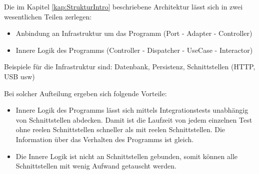 
    Die im Kapitel \ref{kap:StrukturIntro} beschriebene Architektur lässt sich in zwei wesentlichen Teilen zerlegen:
    \begin{itemize}
        \item Anbindung an Infrastruktur um das Programm (Port - Adapter - Controller)
        \item Innere Logik des Programms (Controller - Dispatcher - UseCase - Interactor)
    \end{itemize}

    Beispiele für die Infrastruktur sind: Datenbank, Persistenz, Schnittstellen (HTTP, USB usw)

    Bei solcher Aufteilung ergeben sich folgende Vorteile:
    \begin{itemize}
        \item Innere Logik des Programms lässt sich mittels Integrationstests unabhängig von Schnittstellen abdecken.
        Damit ist die Laufzeit von jedem einzelnen Test ohne reelen Schnittstellen schneller als mit reelen Schnittstellen.
        Die Information über das Verhalten des Programms ist gleich.
        \item Die Innere Logik ist nicht an Schnittstellen gebunden, 
        somit können alle Schnittstellen mit wenig Aufwand getauscht werden.
    \end{itemize}
